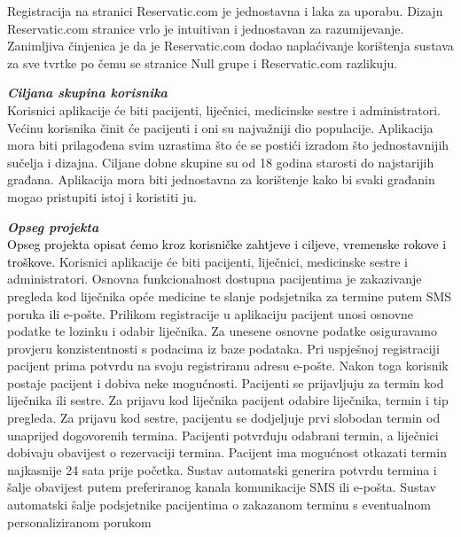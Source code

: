   
              
              \texttt{}{Registracija na stranici Reservatic.com je jednostavna i laka za uporabu. Dizajn Reservatic.com stranice vrlo je intuitivan i jednostavan za razumijevanje. Zanimljiva činjenica je da je Reservatic.com dodao naplaćivanje korištenja sustava za sve tvrtke po čemu se stranice Null grupe i Reservatic.com razlikuju.}
              \newline
            
		       \textbf{\textit{Ciljana skupina korisnika}}\\

         
  
            \texttt{}{
            Korisnici aplikacije će biti pacijenti, liječnici, medicinske sestre i administratori.
            Većinu korisnika činit će pacijenti i oni su najvažniji dio populacije. Aplikacija mora biti prilagođena svim uzrastima što će se postići izradom što jednostavnijih sučelja i dizajna.
            Ciljane dobne skupine su od 18 godina starosti do najstarijih građana. Aplikacija mora biti jednostavna za korištenje kako bi svaki građanin mogao pristupiti istoj i koristiti ju.  }
            \newline


                  \textbf{\textit{Opseg projekta}}\\
  
            \textcolor{black}{Opseg projekta opisat ćemo kroz korisničke zahtjeve i ciljeve, vremenske rokove i troškove. 
            }
            \texttt{}{Korisnici aplikacije će biti pacijenti, liječnici, medicinske sestre i administratori. Osnovna funkcionalnost dostupna pacijentima je zakazivanje pregleda kod liječnika opće medicine te slanje podsjetnika za termine putem SMS poruka ili e-pošte.}
            \texttt{}{ Prilikom registracije u aplikaciju pacijent unosi osnovne podatke te lozinku i odabir liječnika. Za unesene osnovne podatke osiguravamo provjeru konzistentnosti s podacima iz baze podataka. Pri uspješnoj registraciji pacijent prima potvrdu na svoju registriranu adresu e-pošte. Nakon toga korisnik postaje pacijent i dobiva neke mogućnosti. Pacijenti se prijavljuju za termin kod liječnika ili sestre. Za prijavu kod liječnika
pacijent odabire liječnika, termin i tip pregleda. Za prijavu kod sestre, pacijentu se dodjeljuje prvi slobodan termin od unaprijed dogovorenih termina. Pacijenti potvrđuju odabrani termin, a liječnici dobivaju obavijest o rezervaciji termina. Pacijent ima mogućnost otkazati termin najkasnije 24 sata prije početka.
Sustav automatski generira potvrdu termina i šalje obavijest putem 
preferiranog kanala komunikacije SMS ili e-pošta. Sustav automatski šalje 
podsjetnike pacijentima o zakazanom terminu s eventualnom 
personaliziranom porukom}
\newline


